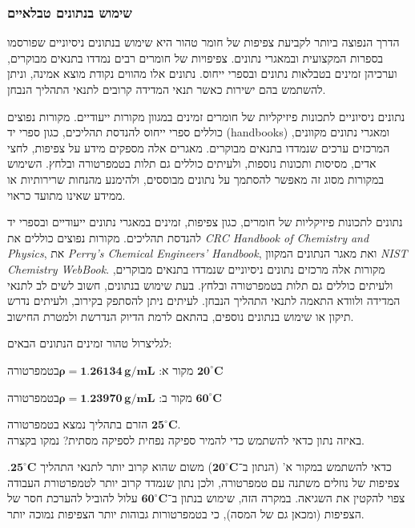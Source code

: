 \documentclass[
  hebrew,
  letterpaper,
  DIV=11,
  numbers=noendperiod]{scrreprt}
\begin{document}
\subsubsection{שימוש בנתונים
טבלאיים}\label{ux5e9ux5d9ux5deux5d5ux5e9-ux5d1ux5e0ux5eaux5d5ux5e0ux5d9ux5dd-ux5d8ux5d1ux5dcux5d0ux5d9ux5d9ux5dd}

הדרך הנפוצה ביותר לקביעת צפיפות של חומר טהור היא שימוש בנתונים ניסיוניים
שפורסמו בספרות המקצועית ובמאגרי נתונים. צפיפויות של חומרים רבים נמדדו
בתנאים מבוקרים, וערכיהן זמינים בטבלאות נתונים ובספרי ייחוס. נתונים אלו
מהווים נקודת מוצא אמינה, וניתן להשתמש בהם ישירות כאשר תנאי המדידה קרובים
לתנאי התהליך הנבחן.

נתונים ניסיוניים לתכונות פיזיקליות של חומרים זמינים במגוון מקורות
ייעודיים. מקורות נפוצים כוללים ספרי ייחוס להנדסת תהליכים, כגון ספרי יד
(handbooks) ומאגרי נתונים מקוונים, המרכזים ערכים שנמדדו בתנאים מבוקרים.
מאגרים אלה מספקים מידע על צפיפות, לחצי אדים, מסיסות ותכונות נוספות,
ולעיתים כוללים גם תלות בטמפרטורה ובלחץ. השימוש במקורות מסוג זה מאפשר
להסתמך על נתונים מבוססים, ולהימנע מהנחות שרירותיות או ממידע שאינו מתועד
כראוי.

נתונים לתכונות פיזיקליות של חומרים, כגון צפיפות, זמינים במאגרי נתונים
ייעודיים ובספרי יד להנדסת תהליכים. מקורות נפוצים כוללים את \emph{CRC
Handbook of Chemistry and Physics}, את \emph{Perry's Chemical Engineers'
Handbook}, ואת מאגר הנתונים המקוון \emph{NIST Chemistry WebBook}. מקורות
אלה מרכזים נתונים ניסיוניים שנמדדו בתנאים מבוקרים, ולעיתים כוללים גם
תלות בטמפרטורה ובלחץ. בעת שימוש בנתונים, חשוב לשים לב לתנאי המדידה
ולוודא התאמה לתנאי התהליך הנבחן. לעיתים ניתן להסתפק בקירוב, ולעיתים נדרש
תיקון או שימוש בנתונים נוספים, בהתאם לרמת הדיוק הנדרשת ולמטרת החישוב.

לגליצרול טהור זמינים הנתונים הבאים:

מקור א:
\(\mathbf{\rho} = \mathbf{1}.\mathbf{26134}\text{ }\mathbf{g}/\mathbf{mL}\)בטמפרטורה
\(\mathbf{20}^{\circ}\mathbf{C}\)

מקור ב:
\(\mathbf{\rho} = \mathbf{1}.\mathbf{23970}\text{ }\mathbf{g}/\mathbf{mL}\)בטמפרטורה
\(\mathbf{60}^{\circ}\mathbf{C}\)

הזרם בתהליך נמצא בטמפרטורה \(\mathbf{25}^{\circ}\mathbf{C}\).\\
באיזה נתון כדאי להשתמש כדי להמיר ספיקה נפחית לספיקה מסתית? נמקו בקצרה.

כדאי להשתמש במקור א' (הנתון ב־\(\mathbf{20}^{\circ}\mathbf{C}\)) משום
שהוא קרוב יותר לתנאי התהליך \(\mathbf{25}^{\circ}\mathbf{C}\). צפיפות של
נוזלים משתנה עם טמפרטורה, ולכן נתון שנמדד קרוב יותר לטמפרטורת העבודה
צפוי להקטין את השגיאה. במקרה הזה, שימוש בנתון
ב־\(\mathbf{60}^{\circ}\mathbf{C}\) עלול להוביל להערכת חסר של הצפיפות
(ומכאן גם של המסה), כי בטמפרטורות גבוהות יותר הצפיפות נמוכה יותר.
\end{document}
